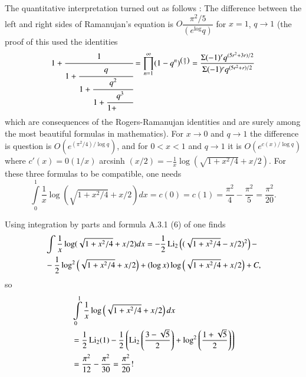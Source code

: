 The quantitative interpretation turned out as follows \cite{art15-key9} : The difference between the left and right sides of Ramanujan's equation is $O\dfrac{\pi^{2}/5}{(e^{\log}q)}$ for $x=1$, $q\to 1$ (the proof of this used the identities
$$
1+\cfrac{1}{1+\cfrac{q}{1+\cfrac{q^{2}}{1+\cfrac{q^{3}}{1+\qquad }{}}}}=\prod\limits^{\infty}_{n=1}(1-q^{n})^{\left(\frac{n}{5}\right)}=\dfrac{\Sigma(-1)^{r}q^{(5r^{2}+3r)/2}}{\Sigma(-1)^{r}q^{(5r^{2}+r)/2}}
$$
which are consequences of the Rogers-Ramanujan identities and are surely among the most beautiful formulas in mathematics). For $x\to 0$ and $q\to 1$ the difference is question is $O(e^{(\pi^{2}/4)/\log q})$, and for $0<x<1$ and $q\to 1$ it is $O(e^{c(x)/\log q})$ where $c'(x)=0(1/x)$ arcsinh $(x/2)=-\frac{1}{x}\log (\sqrt{1+x^{2}/4}+x/2)$. For these three formulas to be compatible, one needs
$$
\int\limits^{1}_{0}\frac{1}{x}\log(\sqrt{1+x^{2}/4}+x/2)dx=c(0)=c(1)=\dfrac{\pi^{2}}{4}-\dfrac{\pi^{2}}{5}=\dfrac{\pi^{2}}{20}.
$$

Using integration by parts and formula A.3.1 (6) of \cite{art15-eq1} one finds
\begin{align*}
& \int\frac{1}{x}\log (\sqrt{1+x^{2}/4}+x/2)dx=-\dfrac{1}{2}\operatorname{Li}_{2}\left((\sqrt{1+x^{2}/4}-x/2)^{2}\right)-\\
& -\frac{1}{2}\log^{2}\left(\sqrt{1+x^{2}/4}+x/2\right)+(\log x)\log\left(\sqrt{1+x^{2}/4}+x/2\right)+C,
\end{align*}\pageoriginale
so
\begin{align*}
& \int\limits^{1}_{0}\frac{1}{x}\log \left(\sqrt{1+x^{2}/4}+x/2\right)dx\\
&=\frac{1}{2}\operatorname{Li}_{2}(1)-\frac{1}{2}\left(\operatorname{Li}_{2}\left(\frac{3-\sqrt{5}}{2}\right)+\log^{2}\left(\frac{1+\sqrt{5}}{2}\right)\right)\\
&=\frac{\pi^{2}}{12}-\frac{\pi^{2}}{30}=\frac{\pi^{2}}{20}!
\end{align*}

